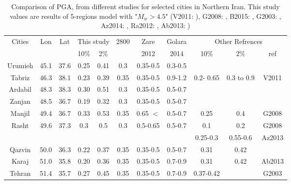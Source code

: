 \begin{table*}[!ht]
\centering
\caption{Comparison of PGA, from different studies for selected cities in Northern Iran. This study values are results of 5-regions model with "$M_w > 4.5$" (V2011:  \citet{Vafaie2011}), G2008: \citet{Ghodrati2008}, B2015: \citet{Boostan2015},  G2003:  \citet{Ghodrati2003},  Az2014: \citet{Abdollahzadeh2014a} , Ra2012: \citet{Rahgozar2012} , Ab2013: \citet{Abdi2013} ) }
\begin{tabular}{ | c | c | c | c | c | c | c | c | c | c | c |}


\hline

	
	\multirow{2}{*}{Cities} & \multirow{2}{*}{Lon} & \multirow{2}{*}{Lat} & \multicolumn{2}{|c|}{This study} & \multirow{2}{*}{2800} & Zare & Golara &\multicolumn{3}{|c|}{Other Refrences}    \\ 
	\cline{4-5}  \cline{9-11}  &  &  & 10\% & 2\% &  &  2012 & 2014 & 10\% & 2\% & ref \\ \hline
	 Urumieh   & 45.1   & 37.6    & 0.25 & 0.41   & 0.3 & 0.35-0.5 & 0.3-0.5 &  &  &  \\ \hline
	 Tabriz       & 46.3    & 38.1   & 0.23 & 0.39   & 0.35 & 0.35-0.5 & 0.9-1.2& 0.2- 0.65 & 0.3 to 0.9 & V2011 \\ \hline
	 Ardabil      & 48.3   & 38.3   & 0.30 & 0.51    & 0.3 & 0.35-0.5 &0.5-0.7  &&  &  \\ \hline
	 Zanjan      & 48.5   & 36.7   & 0.19 & 0.32    & 0.3 & 0.35-0.5 &0.5-0.7  &&  &  \\ \hline
	 Manjil       & 49.4   & 36.7    & 0.33 & 0.53   & 0.35 & 0.65 $<$ &0.5-0.7& 0.25 & 0.4 & G2008 \\ \hline
	  \multirow{2}{*}{Rasht}  & \multirow{2}{*}{49.6} & \multirow{2}{*}{37.3} & \multirow{2}{*}{0.3} & \multirow{2}{*}{0.5} & \multirow{2}{*}{0.3} & \multirow{2}{*}{0.5-0.65} & \multirow{2}{*}{0.5-0.7} & 0.1 &  0.2 &  G2008 \\ 
	  \cline{9-11}	             &  &  &  &  &  &  & & 0.25-0.3 & 0.55-0.6 & Az2013\\ \hline
	 Qazvin     & 50.0   & 36.3    & 0.22 & 0.37   & 0.35 & 0.35-0.5 &0.5-0.7& 0.31 & 0.42 &  \\ \hline
	 Karaj        & 51.0   & 35.8    & 0.20 & 0.36   & 0.35 & 0.35-0.5 &0.7-0.9& 0.31 & 0.42 & Ab2013 \\ \hline
	 \multirow{3}{*}{Tehran}  & \multirow{3}{*}{51.4} & \multirow{3}{*}{35.7} & \multirow{3}{*}{0.27} & \multirow{3}{*}{0.45} & \multirow{3}{*}{0.35} & \multirow{3}{*}{0.35-0.5} & \multirow{3}{*}{0.7-0.9} & 0.37-0.42 &  &  G2003 \\ 

\end{tabular}
\end{table*}
